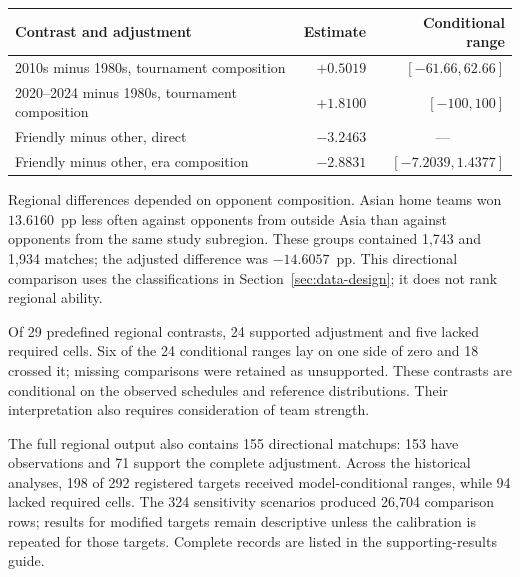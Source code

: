 \begin{table}[htbp]
\centering\small
{}
\label{tab:historical-contrasts}
\begin{tabular}{p{7.4cm}rr}
\toprule
Contrast and adjustment & Estimate & Conditional range \\
\midrule
2010s minus 1980s, tournament composition & $+0.5019$ & $[-61.66,62.66]$ \\
2020--2024 minus 1980s, tournament composition & $+1.8100$ & $[-100,100]$ \\
Friendly minus other, direct & $-3.2463$ & \multicolumn{1}{c}{---} \\
Friendly minus other, era composition & $-2.8831$ & $[-7.2039,1.4377]$ \\
\bottomrule
\end{tabular}
\end{table}

Regional differences depended on opponent composition. Asian home teams won $13.6160$~pp less often against opponents from outside Asia than against opponents from the same study subregion. These groups contained 1,743 and 1,934 matches; the adjusted difference was $-14.6057$~pp. This directional comparison uses the classifications in Section~\ref{sec:data-design}; it does not rank regional ability.

Of 29 predefined regional contrasts, 24 supported adjustment and five lacked required cells. Six of the 24 conditional ranges lay on one side of zero and 18 crossed it; missing comparisons were retained as unsupported. These contrasts are conditional on the observed schedules and reference distributions. Their interpretation also requires consideration of team strength.

The full regional output also contains 155 directional matchups: 153 have observations and 71 support the complete adjustment. Across the historical analyses, 198 of 292 registered targets received model-conditional ranges, while 94 lacked required cells. The 324 sensitivity scenarios produced 26,704 comparison rows; results for modified targets remain descriptive unless the calibration is repeated for those targets. Complete records are listed in the supporting-results guide.



